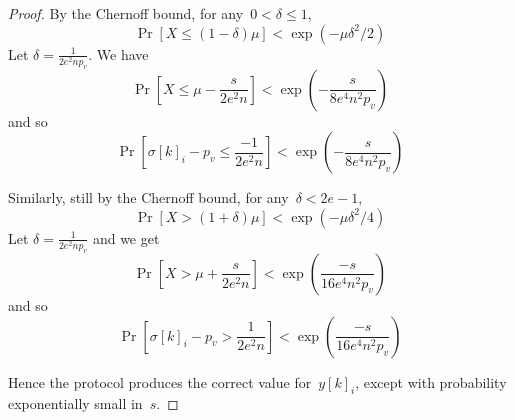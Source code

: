 \documentclass[11pt]{article}
\begin{document}
\begin{proof}
 By the
Chernoff bound, for any~\mbox{$0 < \delta \leq 1$},
\begin{equation}
\Pr[X \leq (1- \delta)\mu] < \exp(-\mu \delta^2/2)
\end{equation}
Let $\delta = \frac{1}{2e^2np_v}$. We have
\begin{equation}
\Pr[X \leq \mu - \frac{s}{2e^2n}]  < \exp(-\frac{s}{8e^4n^2p_v})
\end{equation}
and so
\begin{equation}
\Pr[\sigma[k]_i-p_v \leq \frac{-1}{2e^2n}] <
\exp(-\frac{s}{8e^4n^2p_v})
\end{equation}


 Similarly, still by the Chernoff
bound, for any~\mbox{$\delta < 2e -1$},
\begin{equation}
\Pr[X > (1+\delta) \mu] < \exp(-\mu \delta^2/4)
\end{equation}
Let $\delta = \frac{1}{2e^2np_v}$ and we get
\begin{equation}
\Pr[X >  \mu + \frac{s}{2e^2n}] < \exp(\frac{-s}{16e^4n^2p_v})
\end{equation}
and so
\begin{equation}
\Pr[\sigma[k]_i-p_v > \frac{1}{2e^2n}] <
\exp(\frac{-s}{16e^4n^2p_v})
\end{equation}

Hence the protocol produces the correct value for~$y[k]_i$, except
with probability exponentially small in~$s$.
\end{proof}
\end{document}
